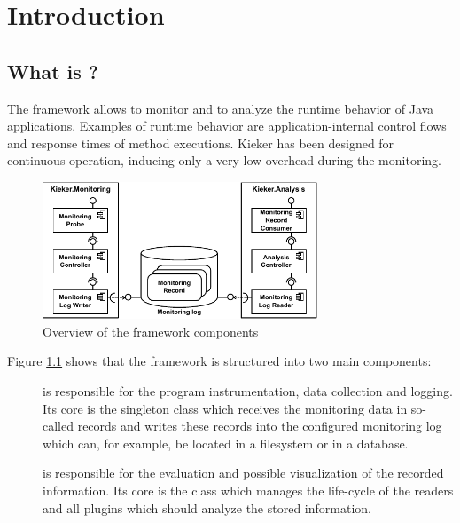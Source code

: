 \chapter{Introduction}
\section{What is \Kieker?}

The \Kieker{} framework allows to monitor and to analyze the runtime behavior %
of Java applications. Examples of runtime behavior are application-internal %
control flows and response times of method executions. %
Kieker has been designed for continuous operation, inducing only a very low %
overhead during the monitoring. 

\begin{figure}[H]\centering
\includegraphics[width=0.73\textwidth]{images/kiekerComponentDiagram-woCloud-bw-w-record-newNames}
\caption{Overview of the framework components}
\label{Figure:KiekerComponentDiagram}
\end{figure}
		
\noindent Figure \ref{Figure:KiekerComponentDiagram} shows that the framework %
is structured into two main components:%
\begin{description}
\item[\KiekerMonitoringPart]
is responsible for the program instrumentation, data %
collection and logging.  Its core is the singleton class  %
which receives the monitoring data in so-called records and %
writes these records into the configured monitoring log which can, for example, %
be located in a filesystem or in a database.
\item[\KiekerAnalysisPart]
is responsible for the evaluation and possible visualization of the %
recorded information. Its core is the class  %
which manages the life-cycle of the readers and all plugins which should analyze %
the stored information.
\end{description}


